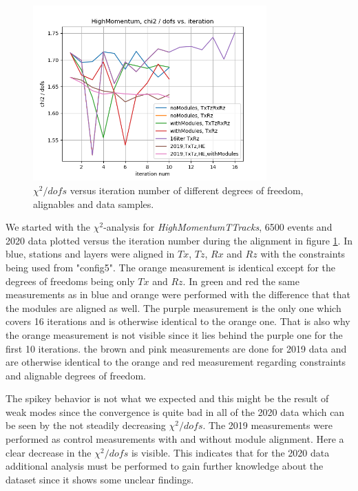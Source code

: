 \begin{figure}
  \centering
  \includegraphics[width=0.8\textwidth]{plots/nov_19/Figure_2.png}
  \caption{$\chi^2 / dofs$ versus iteration number of different degrees of freedom, alignables and data samples.}
  \label{fig:fig2}
\end{figure}

We started with the $\chi^2$-analysis for \textit{HighMomentumTTracks},
6500 events and 2020 data plotted versus the iteration number during the
alignment in figure \ref{fig:fig2}. In blue, stations and layers were aligned in $Tx$,
$Tz$, $Rx$ and $Rz$ with the constraints being used from "config5". The orange
measurement is identical except for the degrees of freedoms being only $Tx$ and $Rz$.
In green and red the same measurements as in blue and orange were performed with
the difference that that the modules are aligned as well.
The purple measurement is the only one which covers 16 iterations and is otherwise identical to the orange one. That is also why the orange measurement is not visible since it lies behind the purple one for the first 10 iterations.
the brown and pink measurements are done for 2019 data and are otherwise identical to the orange and red measurement regarding constraints and alignable degrees of freedom.

The spikey behavior is not what we expected and this might be the result of weak modes since the convergence is quite bad in all of the 2020 data which can be seen by the not
steadily decreasing $\chi^2 / dofs$.
The 2019 measurements were performed as control measurements with and without
module alignment. Here a clear decrease in the $\chi^2 / dofs$ is visible. This
indicates that for the 2020 data additional analysis must be performed to gain further knowledge about the dataset since it shows some unclear findings.


